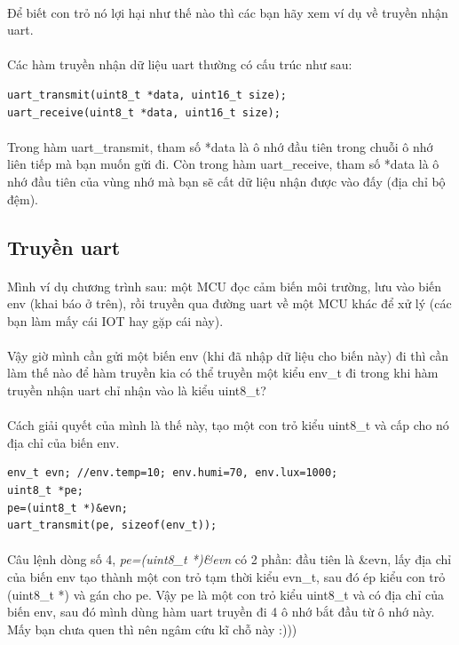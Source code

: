 \documentclass[12pt,a5paper]{book}
\begin{document}
\paragraph{}
Để biết con trỏ nó lợi hại như thế nào thì các bạn hãy xem ví dụ về truyền nhận uart.
\paragraph{}
Các hàm truyền nhận dữ liệu uart thường có cấu trúc như sau:
\begin{lstlisting}
uart_transmit(uint8_t *data, uint16_t size);
uart_receive(uint8_t *data, uint16_t size);
\end{lstlisting}
\paragraph{}
Trong hàm uart\_transmit, tham số *data là ô nhớ đầu tiên trong chuỗi ô nhớ liên tiếp mà bạn muốn gửi đi. Còn trong hàm uart\_receive, tham số *data là ô nhớ đầu tiên của vùng nhớ mà bạn sẽ cất dữ liệu nhận được vào đấy (địa chỉ bộ đệm).
\subsection{Truyền uart}
\paragraph{}
Mình ví dụ chương trình sau: một MCU đọc cảm biến môi trường, lưu vào biến env (khai báo ở trên), rồi truyền qua đường uart về một MCU khác để xử lý (các bạn làm mấy cái IOT hay gặp cái này).

\paragraph{}
Vậy giờ mình cần gửi một biến env (khi đã nhập dữ liệu cho biến này) đi thì cần làm thế nào để hàm truyền kia có thể truyền một kiểu env\_t đi trong khi hàm truyền nhận uart chỉ nhận vào là kiểu uint8\_t?
\paragraph{}
Cách giải quyết của mình là thế này, tạo một con trỏ kiểu uint8\_t và cấp cho nó địa chỉ của biến env.
\begin{lstlisting}
env_t evn; //env.temp=10; env.humi=70, env.lux=1000;
uint8_t *pe;
pe=(uint8_t *)&evn;
uart_transmit(pe, sizeof(env_t));
\end{lstlisting}
\paragraph{}
Câu lệnh dòng số 4, \textit{pe=(uint8\_t *)\&evn} có 2 phần: đầu tiên là \&evn, lấy địa chỉ của biến env tạo thành một con trỏ tạm thời kiểu evn\_t, sau đó ép kiểu con trỏ (uint8\_t *) và gán cho pe. Vậy pe là một con trỏ kiểu uint8\_t và có địa chỉ của biến env, sau đó mình dùng hàm uart truyền đi 4 ô nhớ bắt đầu từ ô nhớ này. Mấy bạn chưa quen thì nên ngâm cứu kĩ chỗ này :)))
\end{document}
